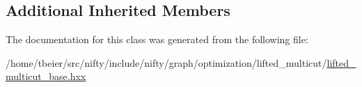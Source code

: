 \subsection*{Additional Inherited Members}


The documentation for this class was generated from the following file\+:\begin{DoxyCompactItemize}
\item 
/home/tbeier/src/nifty/include/nifty/graph/optimization/lifted\+\_\+multicut/\hyperlink{lifted__multicut__base_8hxx}{lifted\+\_\+multicut\+\_\+base.\+hxx}\end{DoxyCompactItemize}
